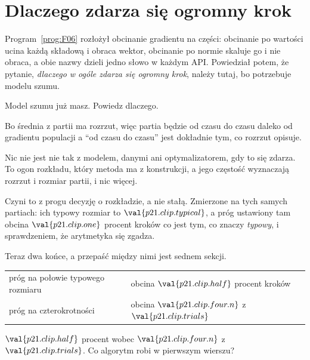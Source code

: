 \section{Dlaczego zdarza się ogromny krok}
\label{sec:P21-clipping}

\begin{fr}
Program~\ref{prog:F06} rozłożył obcinanie gradientu na części: obcinanie po
wartości ucina każdą składową i obraca wektor, obcinanie po normie skaluje go i
nie obraca, a obie nazwy dzieli jedno słowo w każdym API. Powiedział potem, że
pytanie, \emph{dlaczego w ogóle zdarza się ogromny krok}, należy tutaj, bo
potrzebuje modelu szumu.

Model szumu już masz. Powiedz dlaczego.
\dotline
\nextframe
\end{fr}

\begin{fr}
\begin{ansblock}
Bo średnia z partii ma rozrzut, więc partia będzie od czasu do czasu daleko od
gradientu populacji \dash{} a \enquote{od czasu do czasu} jest dokładnie tym,
co rozrzut opisuje.
\end{ansblock}

Nic nie jest nie tak z modelem, danymi ani optymalizatorem, gdy to się zdarza.
To ogon rozkładu, który metoda ma z konstrukcji, a jego częstość wyznaczają
rozrzut i rozmiar partii, i nic więcej.

Czyni to z progu decyzję o rozkładzie, a nie stałą. Zmierzone na tych samych
partiach: ich typowy rozmiar to $\val{p21.clip.typical}$, a próg ustawiony tam
obcina $\val{p21.clip.one}$ procent kroków \dash{} co jest tym, co znaczy
\emph{typowy}, i sprawdzeniem, że arytmetyka się zgadza.
\end{fr}

\begin{fr}
Teraz dwa końce, a przepaść między nimi jest sednem sekcji.

\begin{center}
\begin{tabular}{ll}
\toprule
próg na połowie typowego rozmiaru & obcina $\val{p21.clip.half}$ procent kroków \\
próg na czterokrotności & obcina $\val{p21.clip.four.n}$ z $\val{p21.clip.trials}$ \\
\bottomrule
\end{tabular}
\end{center}

$\val{p21.clip.half}$ procent wobec $\val{p21.clip.four.n}$ z
$\val{p21.clip.trials}$. Co algorytm robi w pierwszym wierszu?
\nextframe
\end{fr}

